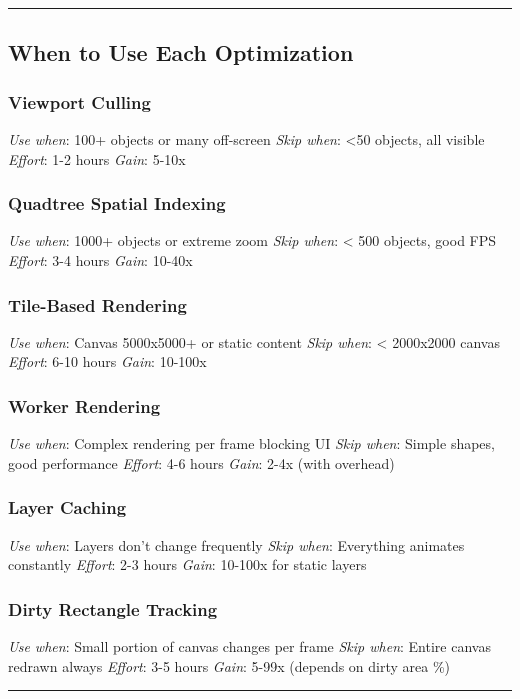 \documentclass[11pt]{article}
\begin{document}
\noindent\rule{\textwidth}{0.5pt}
\subsection{When to Use Each Optimization}
\label{sec:orga892572}

\subsubsection{Viewport Culling}
\label{sec:org7d92f1f}
\emph{Use when}: 100+ objects or many off-screen
\emph{Skip when}: <50 objects, all visible
\emph{Effort}: 1-2 hours
\emph{Gain}: 5-10x
\subsubsection{Quadtree Spatial Indexing}
\label{sec:orgafa4bcc}
\emph{Use when}: 1000+ objects or extreme zoom
\emph{Skip when}: < 500 objects, good FPS
\emph{Effort}: 3-4 hours
\emph{Gain}: 10-40x
\subsubsection{Tile-Based Rendering}
\label{sec:org72ed992}
\emph{Use when}: Canvas 5000x5000+ or static content
\emph{Skip when}: < 2000x2000 canvas
\emph{Effort}: 6-10 hours
\emph{Gain}: 10-100x
\subsubsection{Worker Rendering}
\label{sec:orgf59c412}
\emph{Use when}: Complex rendering per frame blocking UI
\emph{Skip when}: Simple shapes, good performance
\emph{Effort}: 4-6 hours
\emph{Gain}: 2-4x (with overhead)
\subsubsection{Layer Caching}
\label{sec:orgc1d2653}
\emph{Use when}: Layers don't change frequently
\emph{Skip when}: Everything animates constantly
\emph{Effort}: 2-3 hours
\emph{Gain}: 10-100x for static layers
\subsubsection{Dirty Rectangle Tracking}
\label{sec:org6d55121}
\emph{Use when}: Small portion of canvas changes per frame
\emph{Skip when}: Entire canvas redrawn always
\emph{Effort}: 3-5 hours
\emph{Gain}: 5-99x (depends on dirty area \%)

\noindent\rule{\textwidth}{0.5pt}
\end{document}
